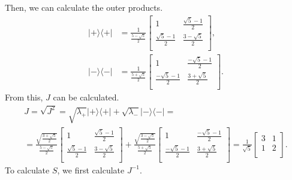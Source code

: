 \documentclass[a4paper,12pt]{article}
\newcommand{\la}{\langle}
\newcommand{\ra}{\rangle}
\begin{document}
    Then, we can calculate the outer products.
    \begin{align}
        \nonumber
        |+\ra \la +| &= \frac{1}{\frac{5 - \sqrt{5}}{2}}
        \begin{bmatrix}
            1 & \frac{\sqrt{5}-1}{2}\\
            \frac{\sqrt{5}-1}{2} & \frac{3 - \sqrt{5}}{2}\\
        \end{bmatrix} \textrm{,} \\
        |-\ra \la -| &= \frac{1}{\frac{5 + \sqrt{5}}{2}}
        \begin{bmatrix}
            1 & \frac{-\sqrt{5}-1}{2}\\
            \frac{-\sqrt{5}-1}{2} & \frac{3 + \sqrt{5}}{2}\\
        \end{bmatrix} \textrm{.}
    \end{align}
    From this, $J$ can be calculated.
    \begin{gather}
        \nonumber
        J = \sqrt{J^2} = \sqrt{\lambda_+} |+\ra\la +| + \sqrt{\lambda_-} |- \ra\la -| =\\
        =
        \frac{\sqrt{\frac{3+\sqrt{5}}{2}}}{\frac{5 - \sqrt{5}}{2}}
        \begin{bmatrix}
            1 & \frac{\sqrt{5}-1}{2}\\
            \frac{\sqrt{5}-1}{2} & \frac{3 - \sqrt{5}}{2}\\
        \end{bmatrix}
        +
        \frac{\sqrt{\frac{3-\sqrt{5}}{2}}}{\frac{5 + \sqrt{5}}{2}}
        \begin{bmatrix}
            1 & \frac{-\sqrt{5}-1}{2}\\
            \frac{-\sqrt{5}-1}{2} & \frac{3 + \sqrt{5}}{2}\\
        \end{bmatrix}
        =
        \frac{1}{\sqrt{5}}
        \begin{bmatrix}
            3 & 1\\
            1 & 2\\
        \end{bmatrix}
        \textrm{.}
    \end{gather}
    To calculate $S$, we first calculate $J^{-1}$.
\end{document}
